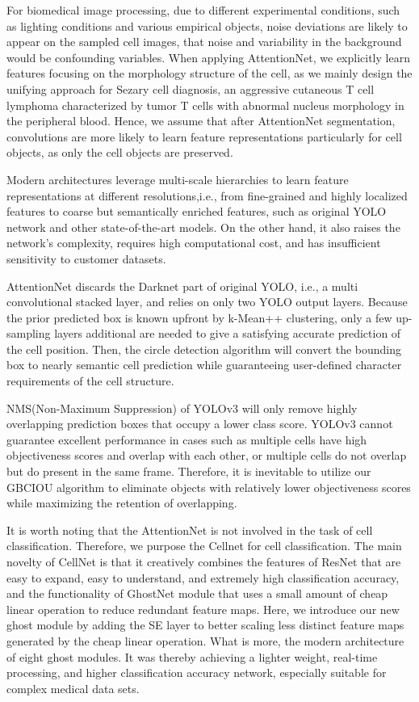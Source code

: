 For biomedical image processing, due to different experimental conditions, such as lighting conditions and various empirical objects, noise deviations are likely to appear on the sampled cell images\cite{6}\cite{7}, that noise and variability in the background would be confounding variables.
When applying AttentionNet, we explicitly learn features focusing on the morphology structure of the cell, as we mainly design the unifying approach for Sezary cell diagnosis, an aggressive cutaneous T cell lymphoma characterized by tumor T cells with abnormal nucleus morphology in the peripheral blood\cite{6}\cite{7}. Hence, we assume that after AttentionNet segmentation, convolutions are more likely to learn feature representations particularly for cell objects, as only the cell objects are preserved.

Modern architectures leverage multi-scale hierarchies to learn feature representations at different resolutions,i.e., from fine-grained and highly localized features to coarse but semantically enriched features, such as original YOLO network\cite{yolov1} and other state-of-the-art models. On the other hand, it also raises the network's complexity, requires high computational cost, and has insufficient sensitivity to customer datasets.

AttentionNet discards the Darknet\cite{33} part of original YOLO\cite{yolov1}, i.e., a multi convolutional stacked layer, and relies on only two YOLO output layers. Because the prior predicted box is known upfront by k-Mean++ clustering, only a few up-sampling layers additional are needed to give a satisfying accurate prediction of the cell position. Then, the circle detection algorithm will convert the bounding box to nearly semantic cell prediction while guaranteeing user-defined character requirements of the cell structure.

NMS(Non-Maximum Suppression) of YOLOv3\cite{33} will only remove highly overlapping prediction boxes that occupy a lower class score. YOLOv3\cite{33}  cannot guarantee excellent performance in cases such as multiple cells have high objectiveness scores and overlap with each other, or multiple cells do not overlap but do present in the same frame. Therefore, it is inevitable to utilize our GBCIOU algorithm to eliminate objects with relatively lower objectiveness scores while maximizing the retention of overlapping.

It is worth noting that the AttentionNet is not involved in the task of cell classification. Therefore, we purpose the Cellnet for cell classification.  The main novelty of CellNet is that it creatively combines the features of ResNet\cite{20} that are easy to expand, easy to understand, and extremely high classification accuracy, and the functionality of GhostNet\cite{19} module that uses a small amount of cheap linear operation to reduce redundant feature maps. Here, we introduce our new ghost module by adding the SE layer\cite{24} to better scaling less distinct feature maps generated by the cheap linear operation. What is more, the modern architecture of eight ghost modules. It was thereby achieving a lighter weight, real-time processing, and higher classification accuracy network, especially suitable for complex medical data sets.



